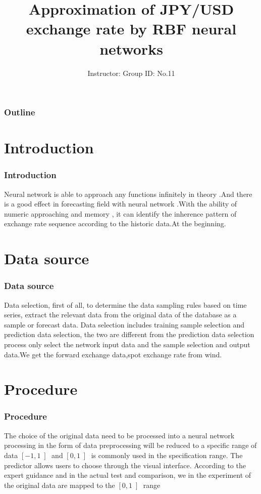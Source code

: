 \documentclass[12pt]{beamer}
\title{Approximation of JPY/USD exchange rate by RBF neural networks}
\author[Group ID: No.11]{Instructor: Group ID: No.11} %
\institute[]{
	\textsl{Project ID: No.9}
}
\date[July 20$^{th}, 2016$]{} %
\begin{document}
	
\begin{frame}
	\titlepage
\end{frame}


\begin{frame}
	\frametitle{Outline}
	\tableofcontents
\end{frame}

\section{Introduction}

\begin{frame}
	\frametitle{Introduction}
	\quad   Neural network is able to approach any functions infinitely in theory .And
there is a good effect in forecasting field with neural network .With the ability
of numeric approaching and memory , it can identify the inherence pattern of
exchange rate sequence according to the historic data.At the beginning.
\end{frame}






\section{Data source}
\begin{frame}
	\frametitle{Data source}
	 \quad Data selection, first of all, to determine the data sampling rules based on time series, extract the relevant data from the original data of the database as a
sample or forecast data. Data selection includes training sample selection and
prediction data selection, the two are different from the prediction data
selection process only select the network input data and the sample selection
and output data.We get the forward exchange data,spot exchange rate from
wind.
\end{frame}


\section{Procedure}

\begin{frame}
	\frametitle{Procedure}
	The choice of the original data need to be processed into a neural network processing in the form of data preprocessing will be reduced to a specific range of data $\left[ -1,1\left] $  and $\left[ 0,1\left] $ is commonly used in the specification range. The predictor allows users to choose through the visual interface. According to the expert guidance and in the actual test and comparison, we in the experiment of the original data are mapped to the $\left[ 0,1\left] $ range\\

\end{frame}
\end{document}
